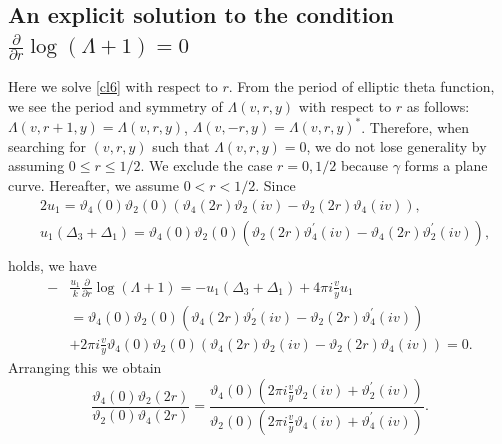 \documentclass[10pt,leqno]{amsart}
\numberwithin{equation}{section}
\begin{document}
\subsection{An explicit solution to the condition \texorpdfstring{$\frac{\partial}{\partial r}\log (\Lambda + 1)=0$}{for the derivative of Lambda}}\label{subsection:An explicit solution to the closure condition}
Here we solve \eqref{cl6} with respect to $r$.
From the period of elliptic theta function, we see the period and symmetry of $\Lambda(v, r, y)$ with respect to $r$ as follows: 
$\Lambda(v, r+1, y)=\Lambda(v, r, y)$, $\Lambda(v, -r, y)=\Lambda(v, r, y)^{*}$.
Therefore, when searching for $(v, r, y)$ such that $\Lambda(v, r, y)=0$, we do not lose generality by assuming $0\leq r\leq 1/2$. We exclude the case $r=0, 1/2$ because $\gamma$ forms a plane curve. Hereafter, we assume $0<r<1/2$.
Since
\begin{equation}
\begin{split}
&2u_{1}=\vartheta_4\left(0\right)\vartheta_2\left(0\right)\left(\vartheta_4\left(2r\right)\vartheta_2\left(iv\right)-\vartheta_2\left(2r\right)\vartheta_4\left(iv\right)\right),\\
&u_{1}\left(\Delta_{3}+\Delta_{1}\right)=\vartheta_4\left(0\right)\vartheta_2\left(0\right)\left(\vartheta_2\left(2r\right)\vartheta_4^{'}\left(iv\right)-\vartheta_4\left(2r\right)\vartheta_2^{'}\left(iv\right)\right),\\
\end{split}
\end{equation}
holds, we have
\begin{equation}\label{close1}
\begin{split}
-&\frac{u_{1}}{k}\frac{\partial}{\partial r}\log (\Lambda + 1)=-u_{1}\left(\Delta_{3}+\Delta_{1}\right)+4\pi i \frac{v}{y}u_{1}\\
&=\vartheta_4\left(0\right)\vartheta_2\left(0\right)\left(\vartheta_4\left(2r\right)\vartheta_2^{'}\left(iv\right)-\vartheta_2\left(2r\right)\vartheta_4^{'}\left(iv\right)\right)\\
&+2\pi i \frac{v}{y}\vartheta_4\left(0\right)\vartheta_2\left(0\right)\left(\vartheta_4\left(2r\right)\vartheta_2\left(iv\right)-\vartheta_2\left(2r\right)\vartheta_4\left(iv\right)\right)=0.
\end{split}
\end{equation}
Arranging this we obtain
\begin{equation}\label{cnphi}
\frac{\vartheta_4\left(0\right)\vartheta_2\left(2r\right)}{\vartheta_2\left(0\right)\vartheta_4\left(2r\right)}=\frac{\vartheta_4\left(0\right)\left(2\pi i\frac{v}{y}\vartheta_2\left(iv\right)+\vartheta_2^{'}\left(iv\right)\right)}{\vartheta_2\left(0\right)\left(2\pi i\frac{v}{y}\vartheta_4\left(iv\right)+\vartheta_4^{'}\left(iv\right)\right)}.
\end{equation}
\end{document}
